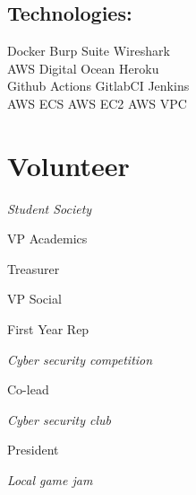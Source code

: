 \documentclass[]{deedy-resume-openfont}
\begin{document}
\begin{minipage}[t]{0.33\textwidth}
\sectionsep
\subsection{Technologies:}
\sectionsep

Docker \textbullet{} Burp Suite \textbullet{} Wireshark\\

AWS \textbullet{} Digital Ocean \textbullet{} Heroku\\

Github Actions \textbullet{} GitlabCI \textbullet{} Jenkins\\

AWS ECS \textbullet{} AWS EC2 \textbullet{} AWS VPC\\

\sectionsep

\section{Volunteer}

\textit{Student Society}
\begin{tightemize}

\item VP Academics

\item Treasurer

\item VP Social

\item First Year Rep

\end{tightemize}
\textit{Cyber security competition}
\begin{tightemize}

\item Co-lead

\end{tightemize}
\textit{Cyber security club}
\begin{tightemize}

\item President

\end{tightemize}
\textit{Local game jam}
\begin{tightemize}


\end{tightemize}
\end{minipage}
\end{document}
